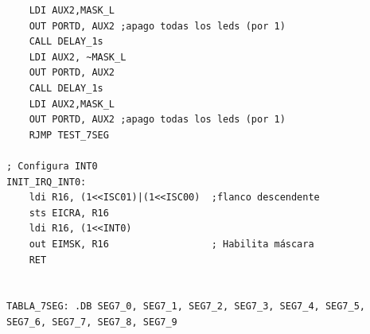 \begin{verbatim}
	LDI AUX2,MASK_L
	OUT PORTD, AUX2 ;apago todas los leds (por 1)  
	CALL DELAY_1s
	LDI AUX2, ~MASK_L
	OUT PORTD, AUX2
	CALL DELAY_1s
	LDI AUX2,MASK_L
	OUT PORTD, AUX2 ;apago todas los leds (por 1)  
	RJMP TEST_7SEG

; Configura INT0
INIT_IRQ_INT0:
	ldi R16, (1<<ISC01)|(1<<ISC00)  ;flanco descendente	
	sts EICRA, R16					
	ldi R16, (1<<INT0)				
	out EIMSK, R16					; Habilita máscara
	RET


TABLA_7SEG:	.DB SEG7_0, SEG7_1, SEG7_2, SEG7_3, SEG7_4, SEG7_5, SEG7_6, SEG7_7, SEG7_8, SEG7_9

\end{verbatim}


